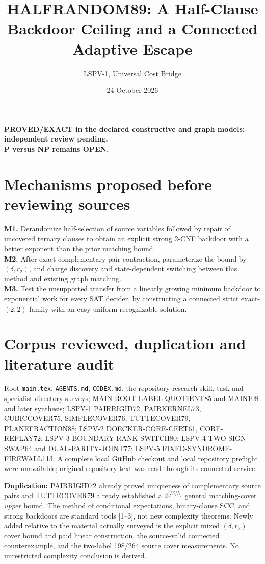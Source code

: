 \documentclass[11pt]{article}
\title{HALFRANDOM89: A Half-Clause Backdoor Ceiling and a Connected Adaptive Escape}
\author{LSPV-1, Universal Cost Bridge}
\date{24 October 2026}
\begin{document}
\maketitle
\begin{center}
\textbf{PROVED/EXACT in the declared constructive and graph models; independent review pending.}\\
\textbf{P versus NP remains OPEN.}
\end{center}

\section{Mechanisms proposed before reviewing sources}
\noindent\textbf{M1.} Derandomize half-selection of source variables followed by repair of uncovered ternary clauses to obtain an explicit strong 2-CNF backdoor with a better exponent than the prior matching bound.\\
\textbf{M2.} After exact complementary-pair contraction, parameterize the bound by $(\delta,r_2)$, and charge discovery and state-dependent switching between this method and existing graph matching.\\
\textbf{M3.} Test the unsupported transfer from a linearly growing minimum backdoor to exponential work for every SAT decider, by constructing a connected strict exact-$(2,2)$ family with an easy uniform recognizable solution.

\section{Corpus reviewed, duplication and literature audit}
Root \texttt{main.tex}, \texttt{AGENTS.md}, \texttt{CODEX.md}, the repository research skill, task and specialist directory surveys; MAIN ROOT-LABEL-QUOTIENT85 and MAIN108 and later synthesis; LSPV-1 PAIRRIGID72, PAIRKERNEL73, CUBICCOVER75, SIMPLECOVER76, TUTTECOVER79, PLANEFRACTION88; LSPV-2 DOECKER-CORE-CERT61, CORE-REPLAY72; LSPV-3 BOUNDARY-RANK-SWITCH80; LSPV-4 TWO-SIGN-SWAP64 and DUAL-PARITY-JOINT77; LSPV-5 FIXED-SYNDROME-FIREWALL113. A complete local GitHub checkout and local repository preflight were unavailable; original repository text was read through its connected service.
\par\noindent
\textbf{Duplication:} PAIRRIGID72 already proved uniqueness of complementary source pairs and TUTTECOVER79 already established a $2^{\lfloor3\delta/5\rfloor}$ general matching-cover \emph{upper} bound. The method of conditional expectations, binary-clause SCC, and strong backdoors are standard tools [1--3], not new complexity theorems. Newly added relative to the material actually surveyed is the explicit mixed $(\delta,r_2)$ cover bound and paid linear construction, the source-valid connected counterexample, and the two-label 198/264 source cover measurements. No unrestricted complexity conclusion is derived.
\end{document}
